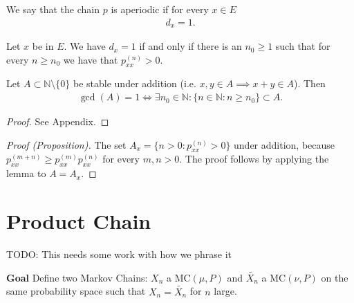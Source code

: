 \begin{defn}
	We say that the chain $p$ is aperiodic if for every $x \in E$
	\begin{align}
	\boxed{d_x=1}.
	\end{align}
\end{defn}

\begin{prop}[]
	Let $x$ be in $E$. We have $d_x=1$ if and only if there is an $n_0 \geq 1$ such that for every $n \geq n_0$ we have that $ p_{xx}^{(n)}>0$.
\end{prop}
\begin{lemma}
	Let $A \subset \mathbb{N}\setminus \{0\}$ be stable under addition (i.e. $x,y\in A \implies x+y \in A$). Then
	\begin{align}
		\gcd (A) = 1 \iff \exists n_0 \in \mathbb{N}: \{n \in \mathbb{N}: n \geq n_0 \} \subset A.	
	\end{align}
	
\end{lemma}
\begin{proof}
	See Appendix.
\end{proof}

\begin{proof}[Proof (Proposition)]
	The set $A_x = \{n> 0: p_{xx}^{(n)}> 0\}$ under addition, because $p_{xx}^{(m+n)} \geq p_{xx}^{(m)}p_{xx}^{(n)}$ for every $m,n> 0$. The proof follows by applying the lemma to $A=A_x$.
\end{proof}


\section{Product Chain}
TODO: This needs some work with how we phrase it

\textbf{Goal} Define two Markov Chains: $X_n$ a MC$(\mu, P)$ and $\tilde{X_n}$ a MC$(\nu, P) $ on the same probability space such that $X_n = \tilde{X_n}$ for $n$ large.

